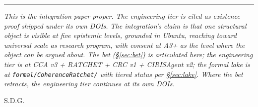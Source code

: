 \documentclass[11pt,a4paper]{article}
\begin{document}
\vspace{1em}
\hrule
\vspace{1em}

\noindent\emph{This is the integration paper proper. The engineering tier is cited as existence proof shipped under its own DOIs. The integration's claim is that one structural object is visible at five epistemic levels, grounded in Ubuntu, reaching toward universal scale as research program, with consent at A3+ as the level where the object can be argued about. The bet (\S\ref{sec:bet}) is articulated here; the engineering tier is at CCA v3 + RATCHET + CRC v1 + CIRISAgent v2; the formal lake is at \texttt{formal/CoherenceRatchet/} with tiered status per \S\ref{sec:lake}. Where the bet retracts, the engineering tier continues at its own DOIs.}

\vspace{1em}
\vspace{2em}
\begin{center}
S.D.G.
\end{center}
\end{document}
